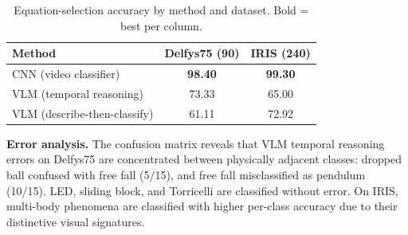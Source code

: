 \documentclass[runningheads]{llncs}
\begin{document}
\begin{table}[t]
  \centering
  \caption{Equation-selection accuracy by method and dataset. Bold = best per column.}
  \label{tab:summary_vlm_methods}
  \small
  \setlength{\tabcolsep}{6pt}
  \renewcommand{\arraystretch}{1.2}
  \begin{tabular}{@{}lcc@{}}
    \toprule
    \textbf{Method} & \textbf{Delfys75 (90)} & \textbf{IRIS (240)} \\
    \midrule
    CNN (video classifier)   & \cellcolor{bestcolor}\textbf{98.40} & \cellcolor{bestcolor}\textbf{99.30} \\
    VLM (temporal reasoning) & 73.33 & 65.00 \\
    VLM (describe-then-classify) & 61.11 & 72.92 \\
    \bottomrule
  \end{tabular}
\end{table}
\noindent
\textbf{Error analysis.} The confusion matrix  reveals that VLM temporal reasoning errors on Delfys75 are concentrated between physically adjacent classes: dropped ball confused with free fall (5/15), and free fall misclassified as pendulum (10/15). LED, sliding block, and Torricelli are classified without error. On IRIS, multi-body phenomena are classified with higher per-class accuracy due to their distinctive visual signatures.




\end{document}
